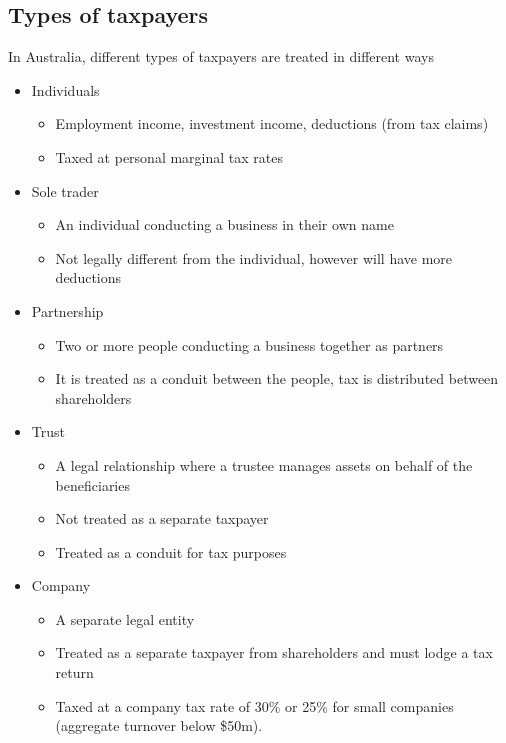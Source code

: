 \documentclass{article}
\begin{document}
	\subsection{Types of taxpayers}

		In Australia, different types of taxpayers are treated in different ways
		\begin{itemize}
			\item Individuals
				\begin{itemize}
					\item Employment income, investment income, deductions (from tax claims)
					\item Taxed at personal marginal tax rates
				\end{itemize}
			\item Sole trader
				\begin{itemize}
					\item An individual conducting a business in their own name
					\item Not legally different from the individual, however will have more deductions
				\end{itemize}
			\item Partnership
				\begin{itemize}
					\item Two or more people conducting a business together as partners
					\item It is treated as a conduit between the people, tax is distributed between shareholders
				\end{itemize}
			\item Trust
				\begin{itemize}
					\item A legal relationship where a trustee manages assets on behalf of the beneficiaries
					\item Not treated as a separate taxpayer
					\item Treated as a conduit for tax purposes
				\end{itemize}
			\item Company
				\begin{itemize}
					\item A separate legal entity
					\item Treated as a separate taxpayer from shareholders and must lodge a tax return
					\item Taxed at a company tax rate of 30\% or 25\% for small companies (aggregate turnover below \$50m).
				\end{itemize}
		\end{itemize}
\end{document}
